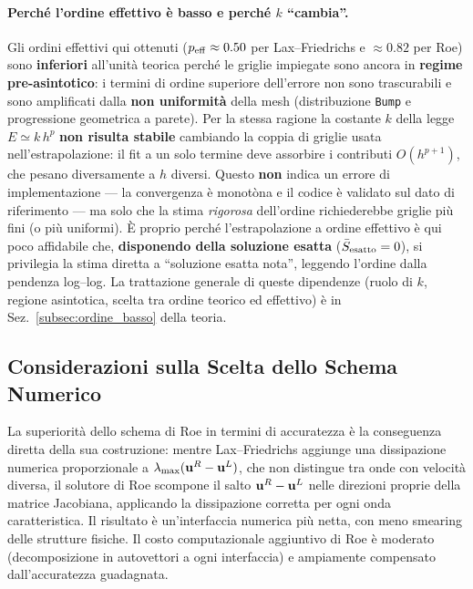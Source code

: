 \paragraph{Perché l'ordine effettivo è basso e perché $k$ ``cambia''.}
Gli ordini effettivi qui ottenuti ($p_{\rm eff}\approx0.50$ per Lax--Friedrichs e $\approx0.82$ per
Roe) sono \textbf{inferiori} all'unità teorica perché le griglie impiegate sono ancora in
\textbf{regime pre-asintotico}: i termini di ordine superiore dell'errore non sono trascurabili e
sono amplificati dalla \textbf{non uniformità} della mesh (distribuzione \texttt{Bump} e progressione
geometrica a parete). Per la stessa ragione la costante $k$ della legge $E\simeq k\,h^p$ \textbf{non
risulta stabile} cambiando la coppia di griglie usata nell'estrapolazione: il fit a un solo termine
deve assorbire i contributi $O(h^{p+1})$, che pesano diversamente a $h$ diversi. Questo \textbf{non}
indica un errore di implementazione --- la convergenza è monotòna e il codice è validato sul dato di
riferimento --- ma solo che la stima \emph{rigorosa} dell'ordine richiederebbe griglie più fini (o
più uniformi). È proprio perché l'estrapolazione a ordine effettivo è qui poco affidabile che,
\textbf{disponendo della soluzione esatta} ($\bar S_{\rm esatto}=0$), si privilegia la stima diretta
a ``soluzione esatta nota'', leggendo l'ordine dalla pendenza log--log. La trattazione generale di
queste dipendenze (ruolo di $k$, regione asintotica, scelta tra ordine teorico ed effettivo) è in
Sez.~\ref{subsec:ordine_basso} della teoria.

\subsection{Considerazioni sulla Scelta dello Schema Numerico}

La superiorità dello schema di Roe in termini di accuratezza è la conseguenza diretta della
sua costruzione: mentre Lax--Friedrichs aggiunge una dissipazione numerica proporzionale a
$\lambda_{\max}(\mathbf{u}^R - \mathbf{u}^L)$, che non distingue tra onde con velocità diversa,
il solutore di Roe scompone il salto $\mathbf{u}^R - \mathbf{u}^L$ nelle direzioni proprie della matrice
Jacobiana, applicando la dissipazione corretta per ogni onda caratteristica. Il risultato è
un'interfaccia numerica più netta, con meno smearing delle strutture fisiche. Il costo
computazionale aggiuntivo di Roe è moderato (decomposizione in autovettori a ogni interfaccia)
e ampiamente compensato dall'accuratezza guadagnata.

